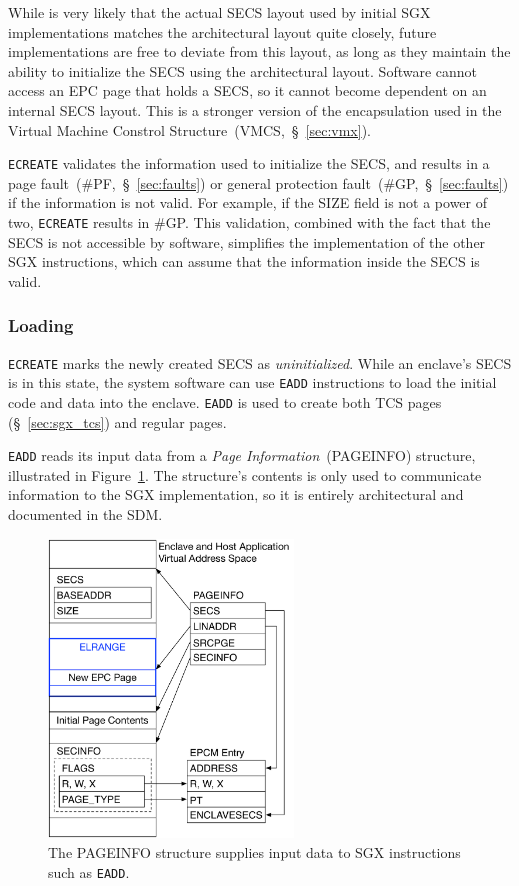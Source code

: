 While is very likely that the actual SECS layout used by initial SGX
implementations matches the architectural layout quite closely, future
implementations are free to deviate from this layout, as long as they maintain
the ability to initialize the SECS using the architectural layout.
Software cannot access an EPC page that holds a SECS, so it cannot become
dependent on an internal SECS layout. This is a stronger version of the
encapsulation used in the Virtual Machine Constrol
Structure~(VMCS,~\S~\ref{sec:vmx}).

\texttt{ECREATE} validates the information used to initialize the SECS, and
results in a page fault~(\#PF,~\S~\ref{sec:faults}) or general protection
fault~(\#GP,~\S~\ref{sec:faults}) if the information is not valid. For example,
if the SIZE field is not a power of two, \texttt{ECREATE} results in \#GP. This
validation, combined with the fact that the SECS is not accessible by software,
simplifies the implementation of the other SGX instructions, which can assume
that the information inside the SECS is valid.


\subsubsection{Loading}
\label{sec:sgx_eadd}

\texttt{ECREATE} marks the newly created SECS as \textit{uninitialized}. While
an enclave's SECS is in this state, the system software can use \texttt{EADD}
instructions to load the initial code and data into the enclave. \texttt{EADD}
is used to create both TCS pages (\S~\ref{sec:sgx_tcs}) and regular pages.


\texttt{EADD} reads its input data from a \textit{Page Information}~(PAGEINFO)
structure, illustrated in Figure~\ref{fig:sgx_pageinfo}. The structure's
contents is only used to communicate information to the SGX implementation, so
it is entirely architectural and documented in the SDM.

\begin{figure}[hbt]
  \centering
  \includegraphics[width=65mm]{figures/sgx_pageinfo.pdf}
  \caption{
    The PAGEINFO structure supplies input data to SGX instructions such as
    \texttt{EADD}.
  }
  \label{fig:sgx_pageinfo}
\end{figure}

